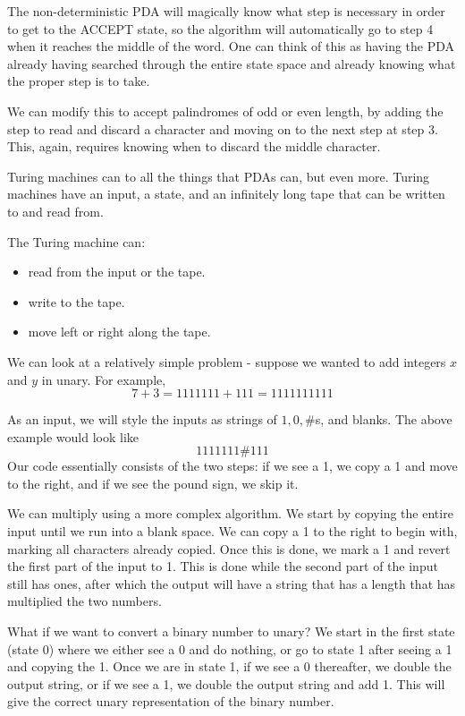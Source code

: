 \documentclass[11pt,twosided]{article}
\begin{document}
The non-deterministic PDA will magically know what step is necessary in order to get to the ACCEPT state, so the algorithm will automatically go to step 4 when it reaches the middle of the word. One can think of this as having the PDA already having searched through the entire state space and already knowing what the proper step is to take. 

We can modify this to accept palindromes of odd or even length, by adding the step to read and discard a character and moving on to the next step at step 3. This, again, requires knowing when to discard the middle character. 

Turing machines can to all the things that PDAs can, but even more. Turing machines have an input, a state, and an infinitely long tape that can be written to and read from. 

The Turing machine can: 
\begin{itemize}
\item read from the input or the tape. 
\item write to the tape.
\item move left or right along the tape. 
\end{itemize}

We can look at a relatively simple problem - suppose we wanted to add integers $x$ and $y$ in unary. For example, 
\[
	7 + 3 = 1111111 + 111 = 1111111111
\] 	

As an input, we will style the inputs as strings of $1, 0, \#$s, and blanks. The above example would look like 
\[
	1111111\#111
\]
Our code essentially consists of the two steps: if we see a 1, we copy a 1 and move to the right, and if we see the pound sign, we skip it. 

We can multiply using a more complex algorithm. We start by copying the entire input until we run into a blank space. We can copy a 1 to the right to begin with, marking all characters already copied. Once this is done, we mark a 1 and revert the first part of the input to 1. This is done while the second part of the input still has ones, after which the output will have a string that has a length that has multiplied the two numbers. 

What if we want to convert a binary number to unary? We start in the first state (state 0) where we either see a 0 and do nothing, or go to state 1 after seeing a 1 and copying the 1. Once we are in state 1, if we see a 0 thereafter, we double the output string, or if we see a 1, we double the output string and add 1. This will give the correct unary representation of the binary number. 
\end{document}

